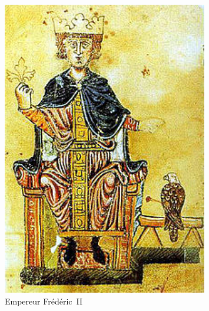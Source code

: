 \begin{minipage}[H]{0.32\linewidth}
  \begin{figure}[H]
  \centering
  \includegraphics[width=0.8\textwidth]{../resources/illustrations/fred-II}
  \caption{Empereur Frédéric~II}
  \end{figure}
\end{minipage}

